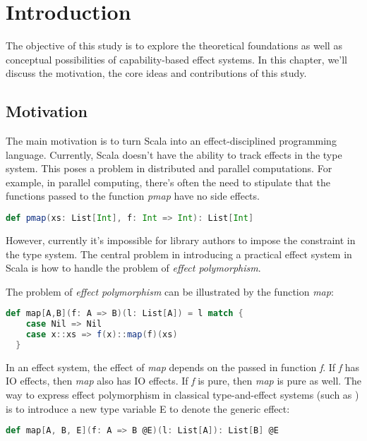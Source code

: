 \section{Introduction}

The objective of this study is to explore the theoretical foundations
as well as conceptual possibilities of capability-based effect
systems. In this chapter, we'll discuss the motivation, the core ideas
and contributions of this study.

\subsection{Motivation}

The main motivation is to turn Scala into an effect-disciplined
programming language. Currently, Scala doesn't have the ability to
track effects in the type system. This poses a problem in distributed
and parallel computations. For example, in parallel computing, there's
often the need to stipulate that the functions passed to the function
\emph{pmap} have no side effects.

\begin{lstlisting}[language=Scala]
def pmap(xs: List[Int], f: Int => Int): List[Int]
\end{lstlisting}

However, currently it's impossible for library authors to impose the
constraint in the type system. The central problem in introducing a
practical effect system in Scala is how to handle the problem of
\emph{effect polymorphism}.

The problem of \emph{effect polymorphism} can be illustrated by the
function \emph{map}:

\begin{lstlisting}[language=Scala]
  def map[A,B](f: A => B)(l: List[A]) = l match {
    case Nil => Nil
    case x::xs => f(x)::map(f)(xs)
  }
\end{lstlisting}

In an effect system, the effect of \emph{map} depends on the passed in
function \emph{f}. If \emph{f} has IO effects, then \emph{map} also
has IO effects. If \emph{f} is pure, then \emph{map} is pure as
well. The way to express effect polymorphism in classical
type-and-effect systems (such as \cite{lucassen1988polymorphic}) is to
introduce a new type variable E to denote the generic effect:

\begin{lstlisting}[language=Scala]
def map[A, B, E](f: A => B @E)(l: List[A]): List[B] @E
\end{lstlisting}

